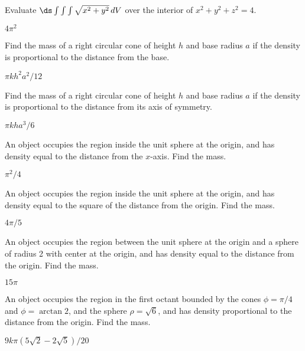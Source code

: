 \begin{exercises}
\begin{exercise} Evaluate $\ds\int\int\int \sqrt{x^2+y^2}\,dV$
over the interior of $x^2+y^2+z^2=4$.
\begin{answer} $4\pi^2$
\end{answer}\end{exercise}

\begin{exercise} Find the mass of a right circular cone of height $h$ and
base radius $a$ if the density is proportional to the distance from
the base.
\begin{answer} $\pi kh^2a^2/12$
\end{answer}\end{exercise}

\begin{exercise} Find the mass of a right circular cone of height $h$ and
base radius $a$ if the density is proportional to the distance from
its axis of symmetry.
\begin{answer} $\pi kha^3/6$
\end{answer}\end{exercise}

\begin{exercise} An object occupies the region inside the unit sphere at the
origin, and has density equal to the distance from the $x$-axis. Find
the mass.
\begin{answer} $\pi^2/4$
\end{answer}\end{exercise}

\begin{exercise} An object occupies the region inside the unit sphere at the
origin, and has density equal to the square of the distance from the
origin. Find the mass.
\begin{answer} $4\pi/5$
\end{answer}\end{exercise}

\begin{exercise} An object occupies the region between the unit sphere at the
origin and a sphere of radius 2 with center at the origin, and has
density equal to the distance from the origin. Find the mass.
\begin{answer} $15\pi$
\end{answer}\end{exercise}

\begin{exercise} An object occupies the region in the first octant bounded by
the cones $\phi = \pi/4$ and $\phi = \arctan 2$, and the sphere $\rho
= \sqrt{6}$, and has density proportional to the distance from the
origin. Find the mass.
\begin{answer} $9k\pi(5\sqrt2-2\sqrt5)/20$
\end{answer}\end{exercise}

\end{exercises}

